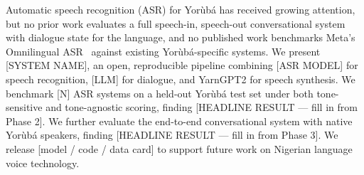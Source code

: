 Automatic speech recognition (ASR) for Yor\`ub\'a has received growing
attention, but no prior work evaluates a full speech-in, speech-out
conversational system with dialogue state for the language, and no
published work benchmarks Meta's Omnilingual ASR~\citep{omnilingual2025}
against existing Yor\`ub\'a-specific systems. We present [SYSTEM NAME], an
open, reproducible pipeline combining [ASR MODEL] for speech recognition,
[LLM] for dialogue, and YarnGPT2 for speech synthesis. We benchmark
[N] ASR systems on a held-out Yor\`ub\'a test set under both tone-sensitive
and tone-agnostic scoring, finding [HEADLINE RESULT — fill in from
Phase 2]. We further evaluate the end-to-end conversational system with
native Yor\`ub\'a speakers, finding [HEADLINE RESULT — fill in from
Phase 3]. We release [model / code / data card] to support future work on
Nigerian language voice technology.
